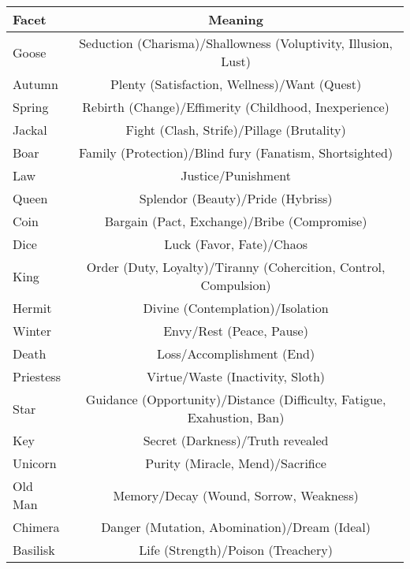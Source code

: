 \documentclass[10pt,a4paper]{report}
\begin{document}
\begin{tabular}{l|c}
\hline
\textbf{Facet} & \textbf{Meaning}\\
\hline
Goose	&	Seduction (Charisma)/Shallowness (Voluptivity, Illusion, Lust)\\
Autumn	 & 	Plenty (Satisfaction, Wellness)/Want (Quest)\\
Spring	&	Rebirth (Change)/Effimerity (Childhood, Inexperience)\\
Jackal	&	Fight (Clash, Strife)/Pillage (Brutality)\\
Boar	&	Family (Protection)/Blind fury (Fanatism, Shortsighted)\\
Law		 &	Justice/Punishment\\
Queen	&	Splendor (Beauty)/Pride (Hybriss)\\
Coin	&	Bargain (Pact, Exchange)/Bribe (Compromise)\\
Dice	&	Luck (Favor, Fate)/Chaos\\
King	&	Order (Duty, Loyalty)/Tiranny (Cohercition, Control, Compulsion)\\
Hermit	&	Divine (Contemplation)/Isolation\\
Winter	&	Envy/Rest (Peace, Pause)\\
Death	&	Loss/Accomplishment (End)\\
Priestess &	Virtue/Waste (Inactivity, Sloth)\\
Star	&	Guidance (Opportunity)/Distance (Difficulty, Fatigue, Exahustion, Ban)\\
Key	    &	Secret (Darkness)/Truth revealed\\
Unicorn	&	Purity (Miracle, Mend)/Sacrifice\\
Old Man	&	Memory/Decay (Wound, Sorrow, Weakness)\\
Chimera	&	Danger  (Mutation, Abomination)/Dream (Ideal)\\
Basilisk &	Life (Strength)/Poison (Treachery)\\
\hline
\end{tabular}
\end{document}
